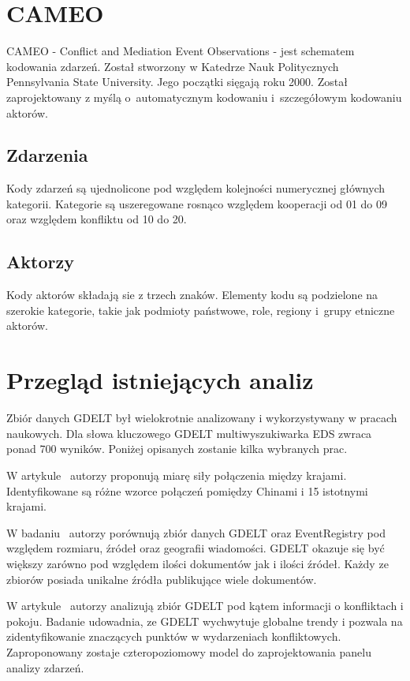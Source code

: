 \documentclass[11pt]{report}
\begin{document}
    \section{CAMEO}\label{sec:cameo}
    CAMEO - Conflict and Mediation Event Observations - jest schematem kodowania zdarzeń.
    Został stworzony w Katedrze Nauk Politycznych Pennsylvania State University.
    Jego początki sięgają roku 2000.
    Został zaprojektowany z myślą o~automatycznym kodowaniu i~szczegółowym kodowaniu aktorów.

    \subsection{Zdarzenia}
    Kody zdarzeń są ujednolicone pod względem kolejności numerycznej głównych kategorii.
    Kategorie są uszeregowane rosnąco względem kooperacji od 01 do 09 oraz względem konfliktu od 10 do 20.

    \subsection{Aktorzy}
    Kody aktorów składają sie z trzech znaków.
    Elementy kodu są podzielone na szerokie kategorie, takie jak podmioty państwowe, role, regiony i~grupy etniczne aktorów.


    \section{Przegląd istniejących analiz} \label{sec:przeglad}
    Zbiór danych GDELT był wielokrotnie analizowany i wykorzystywany w pracach naukowych.
    Dla słowa kluczowego GDELT multiwyszukiwarka EDS zwraca ponad 700 wyników.
    Poniżej opisanych zostanie kilka wybranych prac.

    W artykule~\cite{Yuan2017} autorzy proponują miarę siły połączenia między krajami.
    Identyfikowane są różne wzorce połączeń pomiędzy Chinami i 15 istotnymi krajami.

    W badaniu~\cite{Kwak2016} autorzy porównują zbiór danych GDELT oraz EventRegistry pod względem rozmiaru, źródeł oraz geografii wiadomości.
    GDELT okazuje się być większy zarówno pod względem ilości dokumentów jak i ilości źródeł.
    Każdy ze zbiorów posiada unikalne źródła publikujące wiele dokumentów.

    W artykule~\cite{Keertipati2014} autorzy analizują zbiór GDELT pod kątem informacji o konfliktach i pokoju.
    Badanie udowadnia, ze GDELT wychwytuje globalne trendy i pozwala na zidentyfikowanie znaczących punktów w wydarzeniach konfliktowych.
    Zaproponowany zostaje czteropoziomowy model do zaprojektowania panelu analizy zdarzeń.
\end{document}
